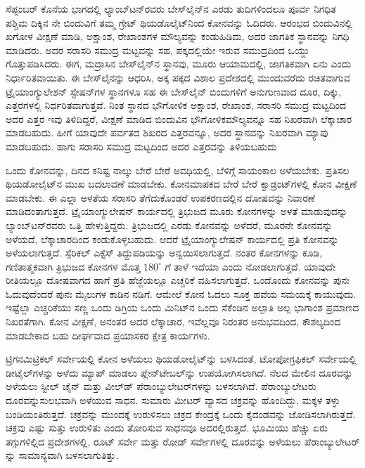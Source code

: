 ಸೆಪ್ಟಂಬರ್​ ಕೊನೆಯ ಭಾಗದಲ್ಲಿ ಲ್ಯಾಂಬ್​ಟನ್​ರವರು ಬೇಸ್‌ಲೈನ್​ನ ಎರಡು ತುದಿಗಳಿಂದಲೂ ಪೂರ್ವ ನಿಗಧಿತ ಪಶ್ಚಿಮ ದಿಕ್ಕಿನ ನೇ ಬಿಂದುವಿಗೆ ತಮ್ಮ ಗ್ರೇಟ್​ ಥಿಯಡೊಲೈಟ್​\break ನಿಂದ ಕೋನವನ್ನು ಓದಿದರು. ಆರಂಭದ ಬಿಂದುವಿನಲ್ಲಿ ಖಗೋಳ ವೀಕ್ಷಣೆ ಮಾಡಿ, ಅಕ್ಷಾಂಶ, ರೇಖಾಂಶಗಳ ಮೌಲ್ಯವನ್ನು ಕಂಡುಹಿಡಿದು, ಅದರ ಜಾಗತಿಕ ಸ್ಥಾನವನ್ನು ನಿಗಧಿ ಮಾಡಿದರು. ಅದರ ಸರಾಸರಿ ಸಮುದ್ರ ಮಟ್ಟವನ್ನು ಸಹ, ಪಕ್ಕದಲ್ಲಿಯೇ ಇರುವ ಸಮುದ್ರದಿಂದ ಒಯ್ದು ಗೊತ್ತುಪಡಿಸಿದರು. ಈಗ, ಮದ್ರಾಸಿನ ಬೇಸ್‌ಲೈನ್​ನ ಸ್ಥಾನವು, ಮೂರು ಆಯಾಮದಲ್ಲಿ, ಜಾಗತಿಕವಾಗಿ ಏನು ಎಂದು ನಿರ್ಧಾರಿತವಾಯಿತು. ಈ ಬೇಸ್‌ಲೈನನ್ನು ಆಧರಿಸಿ, ಅಕ್ಕ ಪಕ್ಕದ ವಿಶಾಲ ಪ್ರದೇಶದಲ್ಲಿ ಮುಂದುವರೆದು ರಚಿತವಾಗುವ ಟ್ರೈಯಾಂಗ್ಯುಲೇಶನ್​ ಸ್ಟೇಷನ್​ಗಳ ಸ್ಥಾನಗಳೂ ಸಹ ಈ ಬೇಸ್‌ಲೈನ್​ ಬಿಂದುಗಳಿಗೆ ಅನುಗುಣವಾದ ದೂರ, ದಿಕ್ಕು, ಎತ್ತರಗಳಲ್ಲಿ ನಿರ್ಧರಿತವಾಗುತ್ತವೆ. ನಿಂತ ಸ್ಥಾನದ ಭೌಗೋಳಿಕ ಅಕ್ಷಾಂಶ, ರೇಖಾಂಶ, ಸರಾಸರಿ ಸಮುದ್ರ ಮಟ್ಟದಿಂದ ಅದರ ಎತ್ತರ ಇವು ತಿಳಿದಿದ್ದರೆ, ವೀಕ್ಷಣೆ ಮಾಡಿದ ಬಿಂದುವಿನ ಭೌಗೋಳಿಕ\break ಮೌಲ್ಯವನ್ನೂ ಸಹ ನಿಖರವಾಗಿ ಲೆಕ್ಕಾಚಾರ ಮಾಡಬಹುದು. ಹೀಗೆ ಯಾವುದೇ ಪರ್ವತದ ಶಿಖರದ ಎತ್ತರವನ್ನೂ, ಅದರ ಸ್ಥಾನವನ್ನು ನಿಖರವಾಗಿ ಮ್ಯಾಪು ಮಾಡಬಹುದು. ಹಾಗು ಸರಾಸರಿ ಸಮುದ್ರ ಮಟ್ಟದಿಂದ ಅದರ ಎತ್ತರವನ್ನು ತಿಳಿಯಬಹುದು

ಒಂದು ಕೋನವನ್ನು, ದಿನದ ಕನಿಷ್ಟ ನಾಲ್ಕು ಬೇರೆ ಬೇರೆ ಅವಧಿಯಲ್ಲಿ, ಬೆಳಿಗ್ಗೆ ಸಾಯಂಕಾಲ ಅಳೆಯಬೇಕು. ಪ್ರತಿಸಲ ಥಿಯಡೋಲೈಟ್​ನ ಮುಖ ಬದಲಾವಣೆ ಮಾಡಬೇಕು. ಕೋನಮಾಪಕದ ಬೇರೆ ಬೇರೆ ಕ್ವಾಡ್ರಂಟ್​ಗಳಲ್ಲಿ ಕೋನ ವೀಕ್ಷಣೆ ಮಾಡಬೇಕು. ಈ ಎಲ್ಲಾ ಅಳತೆಯ ಸರಾಸರಿ ತೆಗೆದುಕೊಂಡರೆ ಉಪಕರಣದಲ್ಲಿನ ದೋಷವನ್ನು ನಿವಾರಣೆ ಮಾಡಿದಂತಾಗುತ್ತದೆ. ಟ್ರೈಯಾಂಗ್ಯುಲೇಷನ್​ ಕಾರ್ಯದಲ್ಲಿ ತ್ರಿಭುಜದ ಮೂರು ಕೋನಗಳನ್ನು ಅಳತೆ ಮಾಡುವುದನ್ನು ಲ್ಯಾಂಬ್​ಟನ್​ರವರು ಒತ್ತಿ ಹೇಳುತ್ತಿದ್ದರು. ತ್ರಿಭುಜದಲ್ಲಿ ಎರಡು ಕೋನವನ್ನು ಅಳೆದರೆ, ಮೂರನೇ ಕೋನವನ್ನು ಅಳೆಯದೆ, ಲೆಕ್ಕಾಚಾರದಿಂದ ಕಂಡುಕೊಳ್ಳಬಹುದು. ಆದರೆ ಟ್ರೈಯಾಂಗ್ಯುಲೇಷನ್​ ಕಾರ್ಯದಲ್ಲಿ ಪ್ರತಿ ಕೋನವನ್ನು ಅಳೆಯಲಾಗುತ್ತದೆ. ಸ್ಪೆರಿಕಲ್​ ಎಕ್ಸೆಸ್​ ತಿದ್ದುಪಡಿಯನ್ನು ಅನ್ವಯಿಸಲಾಗುತ್ತದೆ. ನಂತರ  ಕೋನಗಳನ್ನು ಕೂಡಿ, ಗಣಿತಾತ್ಮಕವಾಗಿ ತ್ರಿಭುಜದ  ಕೋನಗಳ ಮೊತ್ತ $180^\circ$ ಗೆ ತಾಳೆ ಇದೆಯಾ ಎಂದು ನೋಡಲಾಗುತ್ತದೆ. ಯಾವುದೇ ರೀತಿಯಲ್ಲೂ ದೋಷವಾಗದ ಹಾಗೆ ಪ್ರತಿ ಹೆಜ್ಜೆಯಲ್ಲೂ ಎಚ್ಚರಿಕೆ ವಹಿಸಲಾಗುತ್ತದೆ. ಒಂದೊಂದು ಕೋನವನ್ನು ಪುನಃ ಓದುವುದೆಂದರೆ ಪುನಃ  ಮೈಲುಗಳ ಕಾಡಿನ ನಡಿಗೆ. ಆಮೇಲೆ ಕೋನ ಓದಲು ಸೂಕ್ತ ಹವೆಯ ಸಮಯಕ್ಕೆ ಕಾಯುವುದು. ಇಷ್ಟೆಲ್ಲಾ ಎಚ್ಚರಿಕೆಯು ಸಣ್ಣ ಒಂದು ಡಿಗ್ರಿಯ ಒಂದು ಮಿನಿಟ್​ನ ಒಂದು ಸೆಕೆಂಡಿನ ಅಲ್ಪಾತಿ ಅಲ್ಪ ಭಾಗಾಂಶ ಪ್ರಮಾಣದ ನಿಖರತೆಗಾಗಿ. ಕೋನ ವೀಕ್ಷಣೆ, ಅನಂತರ ಅದರ ಲೆಕ್ಕಾಚಾರ, ಇವೆಲ್ಲವೂ ನಿರಂತರ ಅನುಭವದಿಂದ, ಕೌಶಲ್ಯದಿಂದ ಮಾಡಬೇಕಾದ ಬಹು ದೀರ್ಘವಾದ ಪ್ರಯಾಸಕರ ಕ್ಷೇತ್ರ ಕಾರ್ಯಗಳು.

ಟ್ರಿಗನಮಿಟ್ರಿಕಲ್​ ಸರ್ವೇಯಲ್ಲಿ ಕೋನ ಅಳೆಯಲು ಥಿಯಡೋಲೈಟ್​ನ್ನು ಬಳಸಿದಂತೆ, ಟೋಪೋಗ್ರಫಿಕಲ್​ ಸರ್ವೇಯಲ್ಲಿ ಡೀಟೈಲ್​ಗಳನ್ನು ಅಳೆದು ಮ್ಯಾಪ್​ ಮಾಡಲು ಪ್ಲೇನ್​\break ಟೇಬಲ್​ನ್ನು ಉಪಯೋಗಿಸಲಾಗಿದೆ. ನೆಲದ ಮೇಲಿನ ದೂರವನ್ನು ಅಳೆಯಲು ಸ್ಟೀಲ್​ ಚೈನ್​ ಮತ್ತು ವೀಲ್​ಡ್​ ಪೆರಾಂಬ್ಯುಲೇಟರ್​ಗಳನ್ನು ಬಳಸಲಾಗಿದೆ. ಪೆರಾಂಬ್ಯುಲೇಟರು ದೂರವನ್ನು\break ಸುಲಭವಾಗಿ ಅಳೆಯುವ ಸಾಧನ. ಸುಮಾರು  ಮೀಟರ್​ ವ್ಯಾಸದ ಚಕ್ರವನ್ನು ಹೊಂದಿದ್ದು, ಮಕ್ಕಳ ತಳ್ಳು ಬಂಡಿಯಂತಿರುತ್ತದೆ. ಚಕ್ರವನ್ನು ಮುಂದಕ್ಕೆ ಉರುಳಿಸಲು ಚಕ್ರದ ಕೇಂದ್ರಕ್ಕೆ ಒಂದು ಕೈದಂಡವನ್ನು ಜೋಡಿಸಲಾಗಿರುತ್ತದೆ. ಚಕ್ರವು ಎಷ್ಟು ಸುತ್ತು ಉರುಳಿತು ಎಂದು ತೋರಿಸುವ ಸಾಧನವೂ ಅದರಲ್ಲಿರುತ್ತದೆ. ಭೂಮಿಯು ಹೆಚ್ಚು ಏರು ತಗ್ಗುಗಳಿಲ್ಲಿದ ಪ್ರದೇಶಗಳಲ್ಲಿ, ರೂಟ್​ ಸರ್ವೇ ಮತ್ತು ರೋಡ್​ ಸರ್ವೇಗಳಲ್ಲಿ ದೂರವನ್ನು ಅಳೆಯಲು ಪೆರಾಂಬ್ಯುಲೇಟರ್​ನ್ನು ಸಾಮಾನ್ಯವಾಗಿ ಬಳಸಲಾಗುತಿತ್ತು.

